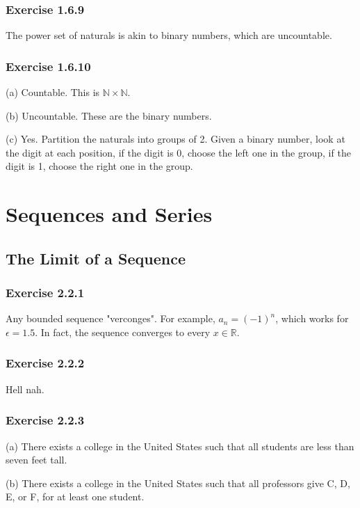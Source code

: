 \documentclass{book}
\begin{document}
\subsection*{Exercise 1.6.9}
The power set of naturals is akin to binary numbers, which are uncountable.

\subsection*{Exercise 1.6.10}
(a)
Countable. This is $\mathbb{N} \times \mathbb{N}$.

\noindent
(b)
Uncountable. These are the binary numbers.

\noindent
(c)
Yes. Partition the naturals into groups of 2. Given a binary number, look at the digit at each position, if the digit is 0, choose the left one in the group, if the digit is 1, choose the right one in the group.

\chapter{Sequences and Series}

\section{}
\section{The Limit of a Sequence}

\subsection*{Exercise 2.2.1}
Any bounded sequence "verconges". For example, $a_n = (-1)^n$, which works for $\epsilon = 1.5$. In fact, the sequence converges to every $x \in \mathbb{R}$.

\subsection*{Exercise 2.2.2}
Hell nah.

\subsection*{Exercise 2.2.3}
(a)
There exists a college in the United States such that all students are less than seven feet tall.

\noindent
(b)
There exists a college in the United States such that all professors give C, D, E, or F, for at least one student.
\end{document}
